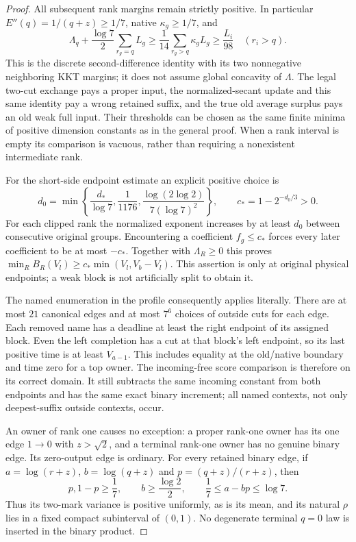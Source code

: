 \begin{proof}
All subsequent rank margins remain strictly positive. In particular
$E''(q)=1/(q+z)\geq1/7$, native $\kappa_g\geq1/7$, and
\[
 \Lambda_q+\frac{\log7}{2}\sum_{r_g=q}L_g
       \geq\frac1{14}\sum_{r_g>q}\kappa_gL_g
       \geq\frac{L_i}{98}\quad(r_i>q).
\]
This is the discrete second-difference identity with its two
nonnegative neighboring KKT margins; it does not assume global
concavity of $\Lambda$. The legal two-cut exchange pays a proper
input, the normalized-secant update and this same identity pay a
wrong retained suffix, and the true old average surplus pays an old
weak full input. Their thresholds can be chosen as the same finite
minima of positive dimension constants as in the general proof.
When a rank interval is empty its comparison is vacuous, rather than
requiring a nonexistent intermediate rank.

For the short-side endpoint estimate an explicit positive choice is
\[
 d_0=\min\left\{\frac{d_*}{\log7},\frac1{1176},
              \frac{\log(2\log2)}{7(\log7)^2}\right\},
 \qquad c_*=1-2^{-d_0/3}>0.
\]
For each clipped rank the normalized exponent increases by at least
$d_0$ between consecutive original groups. Encountering a coefficient
$f_g\leq c_*$ forces every later coefficient to be at most $-c_*$.
Together with $\Lambda_R\geq0$ this proves
$\min_R B_R(V_l)\geq c_*\min(V_l,V_b-V_l)$.
This assertion is only at original physical endpoints; a weak block
is not artificially split to obtain it.

The named enumeration in the profile consequently applies literally.
There are at most $21$ canonical edges and at most $7^6$ choices of
outside cuts for each edge. Each removed name has a deadline at least
the right endpoint of its assigned block. Even the left completion
has a cut at that block's left endpoint, so its last positive time is
at least $V_{a-1}$. This includes equality at the old/native boundary
and time zero for a top owner. The incoming-free score comparison is
therefore on its correct domain. It still subtracts the same incoming
constant from both endpoints and has the same exact binary increment;
all named contexts, not only deepest-suffix outside contexts, occur.

An owner of rank one causes no exception: a proper rank-one owner
has its one edge $1\to0$ with $z>\sqrt2$, and a terminal rank-one
owner has no genuine binary edge. Its zero-output edge is ordinary.
For every retained binary edge, if
$a=\log(r+z)$, $b=\log(q+z)$ and $p=(q+z)/(r+z)$, then
\[
 p,1-p\geq\frac17,\qquad b\geq\frac{\log2}{2},
 \qquad \frac17\leq a-bp\leq\log7.
\]
Thus its two-mark variance is positive uniformly, as is its mean,
and its natural $\rho$ lies in a fixed compact subinterval of $(0,1)$.
No degenerate terminal $q=0$ law is inserted in the binary product.


\end{proof}
